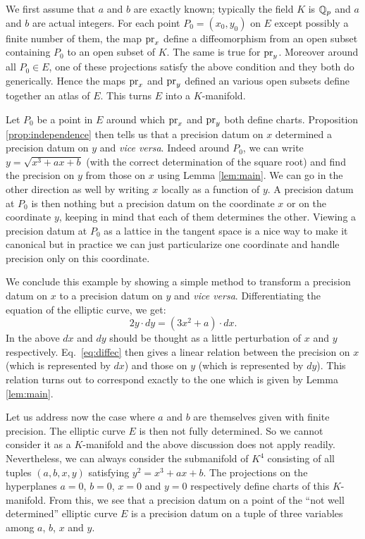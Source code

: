 \documentclass{lms}
\begin{document}
We first assume that $a$ and $b$ are exactly known; typically the field 
$K$ is $\mathbb Q_p$ and $a$ and $b$ are actual integers. For each point $P_0 = 
(x_0, y_0)$ on $E$ except possibly a finite number of them, the map 
$\text{\rm pr}_x$ define a diffeomorphism from an open subset containing $P_0$ to 
an open subset of $K$. The same is true for $\text{\rm pr}_y$. Moreover around all 
$P_0 \in E$, one of these projections satisfy the above condition and
they both do generically. Hence the maps $\text{\rm pr}_x$ and $\text{\rm pr}_y$ defined an 
various open subsets define together an atlas of $E$. This turns $E$ into 
a $K$-manifold.

Let $P_0$ be a point in $E$ around which $\text{\rm pr}_x$ and $\text{\rm pr}_y$ both define 
charts. Proposition \ref{prop:independence} then tells us that a 
precision datum on $x$ determined a precision datum on $y$ and \emph{vice 
versa}. Indeed around $P_0$, we can write $y = \sqrt{x^3 + a x + b}$ 
(with the correct determination of the square root) and find the 
precision on $y$ from those on $x$ using Lemma \ref{lem:main}. We can go 
in the other direction as well by writing $x$ locally as a function of 
$y$. A precision datum at $P_0$ is then nothing but a precision datum
on the coordinate $x$ or on the coordinate $y$, keeping in mind that 
each of them determines the other. Viewing a precision datum at $P_0$ as 
a lattice in the tangent space is a nice way to make it canonical but in 
practice we can just particularize one coordinate and handle precision
only on this coordinate.

We conclude this example by showing a simple method to transform a
precision datum on $x$ to a precision datum on $y$ and \emph{vice versa}.
Differentiating the equation of the elliptic curve, we get:
\begin{equation}
\label{eq:diffec}
2 y \cdot dy = (3 x^2 + a) \cdot dx.
\end{equation}
In the above $dx$ and $dy$ should be thought as a little perturbation of 
$x$ and $y$ respectively. Eq.~\eqref{eq:diffec} then gives a linear 
relation between the precision on $x$ (which is represented by $dx$) and 
those on $y$ (which is represented by $dy$). This relation turns out to
correspond exactly to the one which is given by Lemma \ref{lem:main}.

\medskip

Let us address now the case where $a$ and $b$ are themselves given with 
finite precision. The elliptic curve $E$ is then not fully determined. So 
we cannot consider it as a $K$-manifold and the above discussion does not 
apply readily. Nevertheless, we can always consider the submanifold of 
$K^4$ consisting of all tuples $(a,b,x,y)$ satisfying $y^2 = x^3 + a x + 
b$. The projections on the hyperplanes $a = 0$, $b = 0$, $x = 0$ and $y = 
0$ respectively define charts of this $K$-manifold. From this, we see 
that a precision datum on a point of the ``not well determined'' elliptic 
curve $E$ is a precision datum on a tuple of three variables among $a$, 
$b$, $x$ and $y$.
\end{document}
